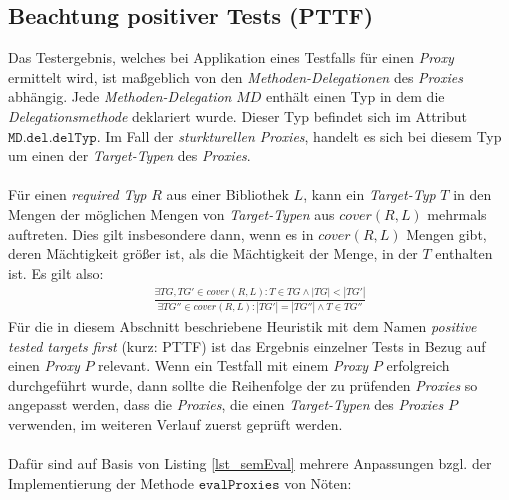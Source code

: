 \subsection{Beachtung positiver Tests (PTTF)}\label{sec_pttf}
Das Testergebnis, welches bei Applikation eines Testfalls für einen \emph{Proxy} ermittelt wird, ist maßgeblich von den \emph{Methoden-Delegationen} des \emph{Proxies} abhängig. Jede \emph{Methoden-Delegation} $\mathit{MD}$ enthält einen Typ in dem die \emph{Delegationsmethode} deklariert wurde. Dieser Typ befindet sich im Attribut $\texttt{MD.del.delTyp}$. Im Fall der \emph{sturkturellen Proxies}, handelt es sich bei diesem Typ um einen der \emph{Target-Typen} des \emph{Proxies}.
\\\\
Für einen \emph{required Typ} $R$ aus einer Bibliothek $L$, kann ein \emph{Target-Typ} $T$ in den Mengen der möglichen Mengen von \emph{Target-Typen} aus $\mathit{cover(R,L)}$ mehrmals auftreten. Dies gilt insbesondere dann, wenn es in $\mathit{cover(R,L)}$ Mengen gibt, deren Mächtigkeit größer ist, als die Mächtigkeit der Menge, in der $T$ enthalten ist. Es gilt also:
\begin{gather*}
\frac{\exists \mathit{TG},\mathit{TG'} \in \mathit{cover(R,L)} :  T \in \mathit{TG} \wedge |\mathit{TG}| < |\mathit{TG'}|}{\exists \mathit{TG''} \in \mathit{cover(R,L)} : |\mathit{TG'}| = |\mathit{TG''}| \wedge T \in \mathit{TG''}}
\end{gather*}
\noindent
Für die in diesem Abschnitt beschriebene \Gls{Heuristik} mit dem Namen \emph{positive tested targets first} (kurz: PTTF) ist das Ergebnis einzelner Tests in Bezug auf einen \emph{Proxy} $P$ relevant. Wenn ein Testfall mit einem \emph{Proxy} $P$ erfolgreich durchgeführt wurde, dann sollte die Reihenfolge der zu prüfenden \emph{Proxies} so angepasst werden, dass die \emph{Proxies}, die einen \emph{Target-Typen} des \emph{Proxies} $P$ verwenden, im weiteren Verlauf zuerst geprüft werden.
\\\\
Dafür sind auf Basis von Listing \ref{lst_semEval} mehrere Anpassungen bzgl. der Implementierung der Methode $\texttt{evalProxies}$ von Nöten:
